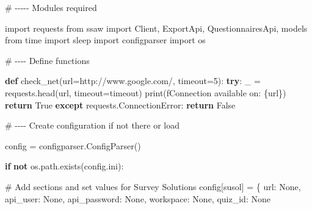 \documentclass[
  letterpaper,
  DIV=11,
  numbers=noendperiod]{scrreprt}
\newenvironment{Shaded}{\begin{snugshade}}{\end{snugshade}}
\newcommand{\BuiltInTok}[1]{\textcolor[rgb]{0.00,0.23,0.31}{#1}}
\newcommand{\CommentTok}[1]{\textcolor[rgb]{0.37,0.37,0.37}{#1}}
\newcommand{\ControlFlowTok}[1]{\textcolor[rgb]{0.00,0.23,0.31}{\textbf{#1}}}
\newcommand{\DecValTok}[1]{\textcolor[rgb]{0.68,0.00,0.00}{#1}}
\newcommand{\ImportTok}[1]{\textcolor[rgb]{0.00,0.46,0.62}{#1}}
\newcommand{\KeywordTok}[1]{\textcolor[rgb]{0.00,0.23,0.31}{\textbf{#1}}}
\newcommand{\NormalTok}[1]{\textcolor[rgb]{0.00,0.23,0.31}{#1}}
\newcommand{\OperatorTok}[1]{\textcolor[rgb]{0.37,0.37,0.37}{#1}}
\newcommand{\PreprocessorTok}[1]{\textcolor[rgb]{0.68,0.00,0.00}{#1}}
\newcommand{\SpecialCharTok}[1]{\textcolor[rgb]{0.37,0.37,0.37}{#1}}
\newcommand{\SpecialStringTok}[1]{\textcolor[rgb]{0.13,0.47,0.30}{#1}}
\newcommand{\StringTok}[1]{\textcolor[rgb]{0.13,0.47,0.30}{#1}}
\newcommand{\VariableTok}[1]{\textcolor[rgb]{0.07,0.07,0.07}{#1}}
\begin{document}
\begin{Shaded}
\begin{Highlighting}[]
\CommentTok{\# {-}{-}{-}{-}{-} Modules required}

\ImportTok{import}\NormalTok{ requests}
\ImportTok{from}\NormalTok{ ssaw }\ImportTok{import}\NormalTok{ Client, ExportApi, QuestionnairesApi, models}
\ImportTok{from}\NormalTok{ time }\ImportTok{import}\NormalTok{ sleep}
\ImportTok{import}\NormalTok{ configparser}
\ImportTok{import}\NormalTok{ os}

\CommentTok{\# {-}{-}{-}{-} Define functions}

\KeywordTok{def}\NormalTok{ check\_net(url}\OperatorTok{=}\StringTok{\textquotesingle{}http://www.google.com/\textquotesingle{}}\NormalTok{, timeout}\OperatorTok{=}\DecValTok{5}\NormalTok{):}
    \ControlFlowTok{try}\NormalTok{:}
\NormalTok{        \_ }\OperatorTok{=}\NormalTok{ requests.head(url, timeout}\OperatorTok{=}\NormalTok{timeout)}
        \BuiltInTok{print}\NormalTok{(}\SpecialStringTok{f\textquotesingle{}Connection available on: }\SpecialCharTok{\{}\NormalTok{url}\SpecialCharTok{\}}\SpecialStringTok{\textquotesingle{}}\NormalTok{)}
        \ControlFlowTok{return} \VariableTok{True}
    \ControlFlowTok{except}\NormalTok{ requests.}\PreprocessorTok{ConnectionError}\NormalTok{:}
        \ControlFlowTok{return} \VariableTok{False}
    
\CommentTok{\# {-}{-}{-}{-} Create configuration if not there or load }

\NormalTok{config }\OperatorTok{=}\NormalTok{ configparser.ConfigParser()}

\ControlFlowTok{if} \KeywordTok{not}\NormalTok{ os.path.exists(}\StringTok{\textquotesingle{}config.ini\textquotesingle{}}\NormalTok{):}
  
   \CommentTok{\# Add sections and set values for Survey Solutions}
\NormalTok{    config[}\StringTok{\textquotesingle{}susol\textquotesingle{}}\NormalTok{] }\OperatorTok{=}\NormalTok{ \{}
        \StringTok{\textquotesingle{}url\textquotesingle{}}\NormalTok{: }\VariableTok{None}\NormalTok{,}
        \StringTok{\textquotesingle{}api\_user\textquotesingle{}}\NormalTok{: }\VariableTok{None}\NormalTok{,}
        \StringTok{\textquotesingle{}api\_password\textquotesingle{}}\NormalTok{: }\VariableTok{None}\NormalTok{,}
        \StringTok{\textquotesingle{}workspace\textquotesingle{}}\NormalTok{: }\VariableTok{None}\NormalTok{,}
        \StringTok{\textquotesingle{}quiz\_id\textquotesingle{}}\NormalTok{: }\VariableTok{None}
          

\end{Highlighting}
\end{Shaded}
\end{document}
